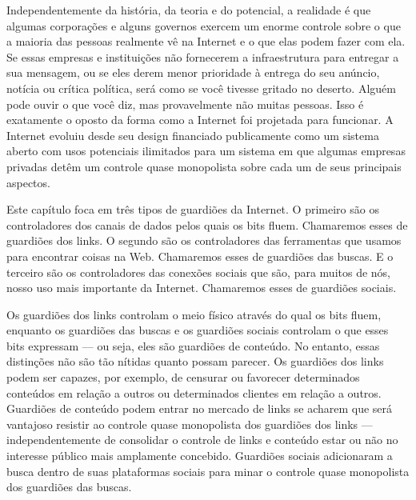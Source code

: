 Independentemente da história, da teoria e do potencial, a realidade é que algumas
corporações e alguns governos exercem um enorme controle sobre o que a maioria das pessoas
realmente vê na Internet e o que elas podem fazer com ela. Se essas empresas e instituições
não fornecerem a infraestrutura para entregar a sua mensagem, ou se eles derem menor
prioridade à entrega do seu anúncio, notícia ou crítica política, será como se você tivesse
gritado no deserto. Alguém pode ouvir o que você diz, mas provavelmente não muitas pessoas.
Isso é exatamente o oposto da forma como a Internet foi projetada para funcionar. A Internet
evoluiu desde seu design financiado publicamente como um sistema aberto com usos potenciais
ilimitados para um sistema em que algumas empresas privadas detêm um controle quase
monopolista sobre cada um de seus principais aspectos.

Este capítulo foca em três tipos de guardiões da Internet. O primeiro são os controladores
dos canais de dados pelos quais os bits fluem. Chamaremos esses de guardiões dos links. O
segundo são os controladores das ferramentas que usamos para encontrar coisas na Web.
Chamaremos esses de guardiões das buscas. E o terceiro são os controladores das conexões
sociais que são, para muitos de nós, nosso uso mais importante da Internet. Chamaremos esses
de guardiões sociais.

Os guardiões dos links controlam o meio físico através do qual os bits fluem, enquanto os
guardiões das buscas e os guardiões sociais controlam o que esses bits expressam --- ou seja,
eles são guardiões de conteúdo. No entanto, essas distinções não são tão nítidas quanto
possam parecer. Os guardiões dos links podem ser capazes, por exemplo, de censurar ou
favorecer determinados conteúdos em relação a outros ou determinados clientes em relação a
outros. Guardiões de conteúdo podem entrar no mercado de links se acharem que será vantajoso
resistir ao controle quase monopolista dos guardiões dos links --- independentemente de
consolidar o controle de links e conteúdo estar ou não no interesse público mais amplamente
concebido. Guardiões sociais adicionaram a busca dentro de suas plataformas sociais para minar
o controle quase monopolista dos guardiões das buscas.

